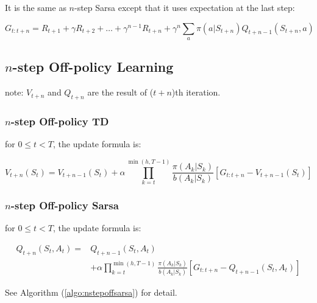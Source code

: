 It is the same as $n$-step Sarsa except that it uses expectation at the last step:
	
\begin{equation}
	G_{t:t+n} = R_{t+1} + \gamma R_{t+2} + \dots + \gamma^{n-1} R_{t+n} + \gamma^n \sum_a \pi(a|S_{t+n}) Q_{t+n-1}(S_{t+n},a)
\end{equation}


\subsection{$n$-step Off-policy Learning}

note: $V_{t+n}$ and $Q_{t+n}$ are the result of ($t+n$)th iteration.

\subsubsection{$n$-step Off-policy TD}

for $0 \leq t < T$, the update formula is:

\begin{equation}
	V_{t+n}(S_t)=V_{t+n-1}(S_t)+\alpha \prod_{k=t}^{\min (h,T-1)} \frac{\pi(A_k|S_k)}{b(A_k|S_k)} [G_{t:t+n} - V_{t+n-1}(S_t)]
\end{equation}



\subsubsection{$n$-step Off-policy Sarsa}

for $0 \leq t < T$, the update formula is:

\begin{equation}
\begin{split}
	Q_{t+n}(S_t,A_t)=&Q_{t+n-1}(S_t,A_t) \\
	&+\alpha \prod_{k=t}^{\min (h,T-1)} \frac{\pi(A_k|S_k)}{b(A_k|S_k)} [G_{t:t+n} - Q_{t+n-1}(S_t,A_t)]
\end{split}
\end{equation}

See Algorithm (\ref{algo:nstepoffsarsa}) for detail.


